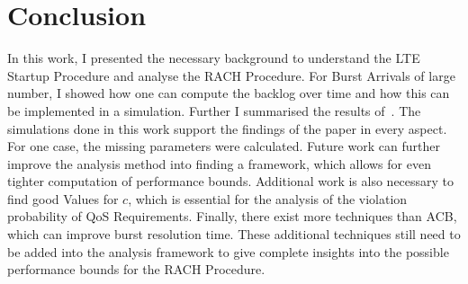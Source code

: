 \documentclass[conference]{IEEEtran}
\begin{document}
\section{Conclusion}
In this work, I presented the necessary background to understand the LTE Startup Procedure and analyse the RACH Procedure.
For Burst Arrivals of large number, I showed how one can compute the backlog over time and how this can be implemented in a simulation.
Further I summarised the results of~\cite{8422323}.
The simulations done in this work support the findings of the paper in every aspect.
For one case, the missing parameters were calculated.
Future work can further improve the analysis method into finding a framework, which allows for even tighter computation of performance bounds.
Additional work is also necessary to find good Values for $c$, which is essential for the analysis of the violation probability of QoS Requirements.
Finally, there exist more techniques than ACB, which can improve burst resolution time.
These additional techniques still need to be added into the analysis framework to give complete insights into the possible performance bounds for the RACH Procedure.
\end{document}
